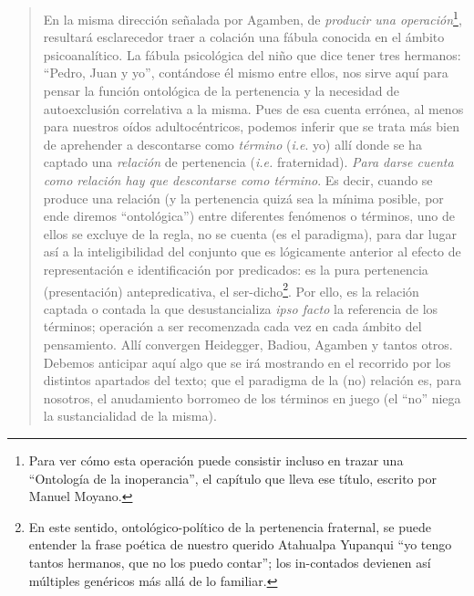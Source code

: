 \begin{quote}
En la misma dirección señalada por Agamben, de \emph{producir una operación}\footnote{Para ver cómo esta operación puede consistir incluso en trazar una \enquote{Ontología de la inoperancia}, el capítulo que lleva ese título, escrito por Manuel Moyano.}, resultará esclarecedor  traer a colación una fábula conocida en el ámbito psicoanalítico. La fábula psicológica del niño que dice tener tres hermanos: \enquote{Pedro, Juan y yo}, contándose él mismo entre ellos, nos sirve aquí para pensar la función ontológica de la pertenencia y la necesidad de autoexclusión correlativa a la misma. Pues de esa cuenta errónea, al menos para nuestros oídos adultocéntricos, podemos inferir que se trata más bien de aprehender a descontarse como \emph{término} (\emph{i.e}. yo) allí donde se ha captado una \emph{relación} de pertenencia (\emph{i.e.} fraternidad). \emph{Para darse cuenta como relación hay que descontarse como término}. Es decir, cuando se produce una relación (y la pertenencia quizá sea la mínima posible, por ende diremos \enquote{ontológica}) entre diferentes fenómenos o términos, uno de ellos se excluye de la regla, no se cuenta (es el paradigma), para dar lugar así a la inteligibilidad del conjunto que es lógicamente anterior al efecto de representación e identificación por predicados: es la pura pertenencia (presentación) antepredicativa, el ser-dicho\footnote{En este sentido, ontológico-político de la pertenencia fraternal, se puede entender la frase poética de nuestro querido Atahualpa Yupanqui \enquote{yo tengo tantos hermanos, que no los puedo contar}; los in-contados devienen así múltiples genéricos más allá de lo familiar.}. Por ello, es la relación captada o contada la que desustancializa \emph{ipso facto} la referencia de los términos; operación a ser recomenzada cada vez en cada ámbito del pensamiento. Allí convergen Heidegger, Badiou, Agamben y tantos otros. Debemos anticipar aquí algo que se irá mostrando en el recorrido por los distintos apartados del texto; que el paradigma de la (no) relación es, para nosotros, el anudamiento borromeo de los términos en juego (el \enquote{no} niega la sustancialidad de la misma).


\end{quote}
